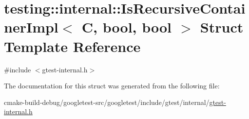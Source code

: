 \hypertarget{structtesting_1_1internal_1_1IsRecursiveContainerImpl}{}\section{testing\+::internal\+::Is\+Recursive\+Container\+Impl$<$ C, bool, bool $>$ Struct Template Reference}
\label{structtesting_1_1internal_1_1IsRecursiveContainerImpl}


{\ttfamily \#include $<$gtest-\/internal.\+h$>$}



The documentation for this struct was generated from the following file\+:\begin{DoxyCompactItemize}
\item 
cmake-\/build-\/debug/googletest-\/src/googletest/include/gtest/internal/\mbox{\hyperlink{gtest-internal_8h}{gtest-\/internal.\+h}}\end{DoxyCompactItemize}
